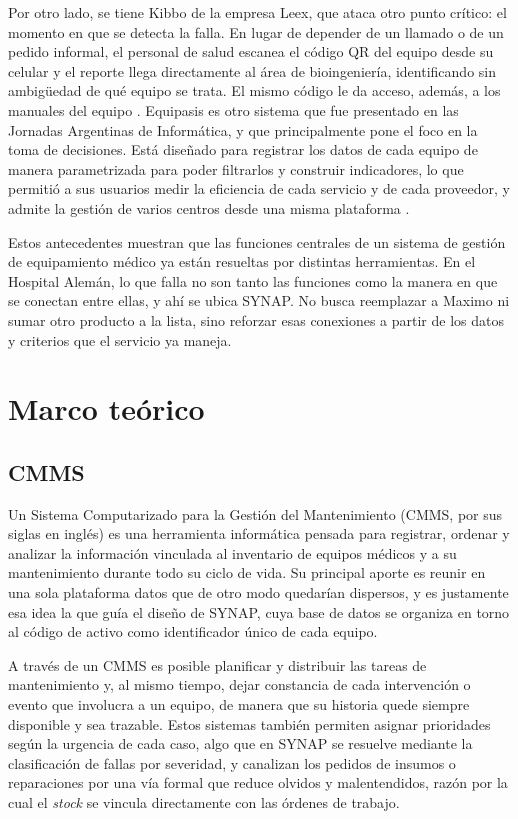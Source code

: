 \documentclass[10pt]{article}
\begin{document}
Por otro lado, se tiene Kibbo de la empresa Leex, que ataca otro punto crítico: el momento en que se detecta la falla. En lugar de depender de un llamado o de un pedido informal, el personal de salud escanea el código QR del equipo desde su celular y el reporte llega directamente al área de bioingeniería, identificando sin ambigüedad de qué equipo se trata. El mismo código le da acceso, además, a los manuales del equipo \cite{leex_medical}. Equipasis es otro sistema que fue presentado en las Jornadas Argentinas de Informática, y que principalmente pone el foco en la toma de decisiones. Está diseñado para registrar los datos de cada equipo de manera parametrizada para poder filtrarlos y construir indicadores, lo que permitió a sus usuarios medir la eficiencia de cada servicio y de cada proveedor, y admite la gestión de varios centros desde una misma plataforma \cite{equipasis}.

Estos antecedentes muestran que las funciones centrales de un sistema de gestión de equipamiento médico ya están resueltas por distintas herramientas. En el Hospital Alemán, lo que falla no son tanto las funciones como la manera en que se conectan entre ellas, y ahí se ubica SYNAP. No busca reemplazar a Maximo ni sumar otro producto a la lista, sino reforzar esas conexiones a partir de los datos y criterios que el servicio ya maneja.

\newpage
\section{Marco teórico}
\subsection{CMMS}
Un Sistema Computarizado para la Gestión del Mantenimiento (CMMS, por sus siglas en inglés) es una herramienta informática pensada para registrar, ordenar y analizar la información vinculada al inventario de equipos médicos y a su mantenimiento durante todo su ciclo de vida. Su principal aporte es reunir en una sola plataforma datos que de otro modo quedarían dispersos, y es justamente esa idea la que guía el diseño de SYNAP, cuya base de datos se organiza en torno al código de activo como identificador único de cada equipo.

A través de un CMMS es posible planificar y distribuir las tareas de mantenimiento y, al mismo tiempo, dejar constancia de cada intervención o evento que involucra a un equipo, de manera que su historia quede siempre disponible y sea trazable. Estos sistemas también permiten asignar prioridades según la urgencia de cada caso, algo que en SYNAP se resuelve mediante la clasificación de fallas por severidad, y canalizan los pedidos de insumos o reparaciones por una vía formal que reduce olvidos y malentendidos, razón por la cual el \textit{stock} se vincula directamente con las órdenes de trabajo.
\end{document}
